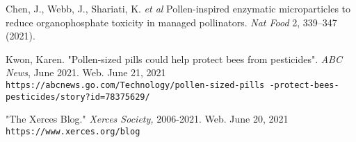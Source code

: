 \documentclass[12pt]{article}
\begin{document}
\clearpage

\begin{thebibliography}{9}

Chen, J., Webb, J., Shariati, K. \textit{et al}
 Pollen-inspired enzymatic microparticles to reduce organophosphate toxicity in managed pollinators. \textit{Nat Food} 2, 339–347 (2021).

Kwon, Karen. "Pollen-sized pills could help protect bees from pesticides".\textit{ ABC News}, June 2021. Web. June 21, 2021
\\\texttt{https://abcnews.go.com/Technology/pollen-sized-pills
-protect-bees-pesticides/story?id=78375629/}

"The Xerces Blog."\textit{ Xerces Society,} 2006-2021. Web. June 20, 2021
\\\texttt{https://www.xerces.org/blog}
\end{thebibliography}




\end{document}
